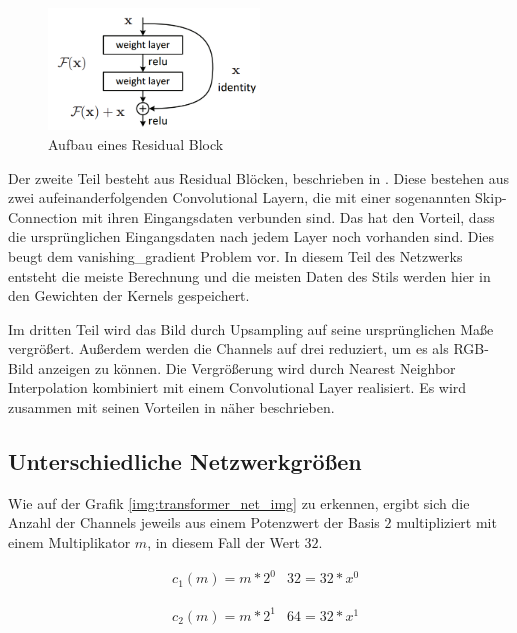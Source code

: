 \begin{figure}[H]
	\centering
	\includegraphics[width=0.50\textwidth]{resources/content/residual_block.png}
	\caption{Aufbau eines Residual Block \cite{residual_block_img}}
	\label{img:residual_block_img}
\end{figure}

Der zweite Teil besteht aus Residual Blöcken, beschrieben in \cite{DBLP:journals/corr/HeZRS15}. Diese bestehen aus zwei aufeinanderfolgenden Convolutional Layern, die mit einer sogenannten Skip-Connection mit ihren Eingangsdaten verbunden sind. Das hat den Vorteil, dass die ursprünglichen Eingangsdaten nach jedem Layer noch vorhanden sind. Dies beugt dem \gls{vanishing_gradient} Problem vor. In diesem Teil des Netzwerks entsteht die meiste Berechnung und die meisten Daten des Stils werden hier in den Gewichten der Kernels gespeichert.

Im dritten Teil wird das Bild durch Upsampling auf seine ursprünglichen Maße vergrößert. Außerdem werden die Channels auf drei reduziert, um es als RGB-Bild anzeigen zu können. Die Vergrößerung wird durch Nearest Neighbor Interpolation kombiniert mit einem Convolutional Layer realisiert. Es wird zusammen mit seinen Vorteilen in \cite{odena2016deconvolution} näher beschrieben.

\pagebreak

\subsection{Unterschiedliche Netzwerkgrößen}

Wie auf der Grafik \ref{img:transformer_net_img} zu erkennen, ergibt sich die Anzahl der Channels jeweils aus einem Potenzwert der Basis $ 2 $ multipliziert mit einem Multiplikator $ m $, in diesem Fall der Wert $ 32 $.

\begin{align}
	& c_{1}(m) = m * 2^{0}
	& 32 = 32 * x^{0}
\end{align}

\begin{align}
	& c_{2}(m) = m * 2^{1}
	& 64 = 32 * x^{1}
\end{align}

